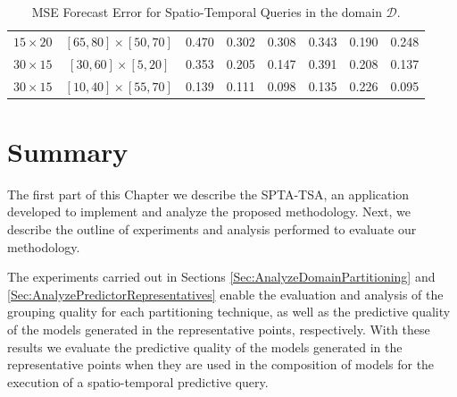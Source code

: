\begin{table}[h]
\begin{tabular}{|c|c|r|r|r|r|r|r|}
		$15 \times 20$ & $[65, 80] \times [50, 70]$ & 0.470 & 0.302 & 0.308 & \cellcolor{red!20}0.343 & 0.190 & 0.248 \\ %
		$30 \times 15$ & $[30, 60] \times [ 5, 20]$ & 0.353 & 0.205 & 0.147 & \cellcolor{red!20}0.391 & 0.208 & 0.137 \\ %
		$30 \times 15$ & $[10, 40] \times [55, 70]$ & 0.139 & 0.111 & 0.098 & \cellcolor{red!20}0.135 & 0.226 & 0.095 \\ %
		\hline
	\end{tabular}
	\caption{MSE Forecast Error for Spatio-Temporal Queries in the domain $\mathcal{D}$.}
	\label{Table:MSEForecasError}
\end{table}


\section{Summary} 

The first part of this Chapter we describe the SPTA-TSA, an application developed to implement and analyze the proposed methodology. Next, we describe the outline of experiments and analysis performed to evaluate our methodology. 

The experiments carried out in Sections \ref{Sec:AnalyzeDomainPartitioning} and \ref{Sec:AnalyzePredictorRepresentatives} enable the evaluation and analysis of the grouping quality for each partitioning technique, as well as the predictive quality of the models generated in the representative points, respectively. With these results we evaluate the predictive quality of the models generated in the representative points when they are used in the composition of models for the execution of a spatio-temporal predictive query. 




